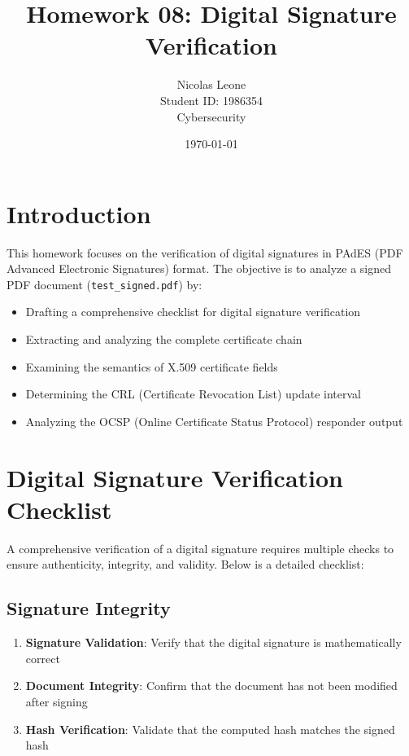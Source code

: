 \documentclass[12pt,a4paper]{article}
\title{Homework 08: Digital Signature Verification}
\author{Nicolas Leone\\Student ID: 1986354\\Cybersecurity}
\date{\today}
\begin{document}
\maketitle

\tableofcontents
\newpage

\section{Introduction}

This homework focuses on the verification of digital signatures in PAdES (PDF Advanced Electronic Signatures) format. The objective is to analyze a signed PDF document (\texttt{test\_signed.pdf}) by:

\begin{itemize}
    \item Drafting a comprehensive checklist for digital signature verification
    \item Extracting and analyzing the complete certificate chain
    \item Examining the semantics of X.509 certificate fields
    \item Determining the CRL (Certificate Revocation List) update interval
    \item Analyzing the OCSP (Online Certificate Status Protocol) responder output
\end{itemize}

\section{Digital Signature Verification Checklist}

A comprehensive verification of a digital signature requires multiple checks to ensure authenticity, integrity, and validity. Below is a detailed checklist:

\subsection{Signature Integrity}
\begin{enumerate}
    \item \textbf{Signature Validation}: Verify that the digital signature is mathematically correct
    \item \textbf{Document Integrity}: Confirm that the document has not been modified after signing
    \item \textbf{Hash Verification}: Validate that the computed hash matches the signed hash
\end{enumerate}
\end{document}
